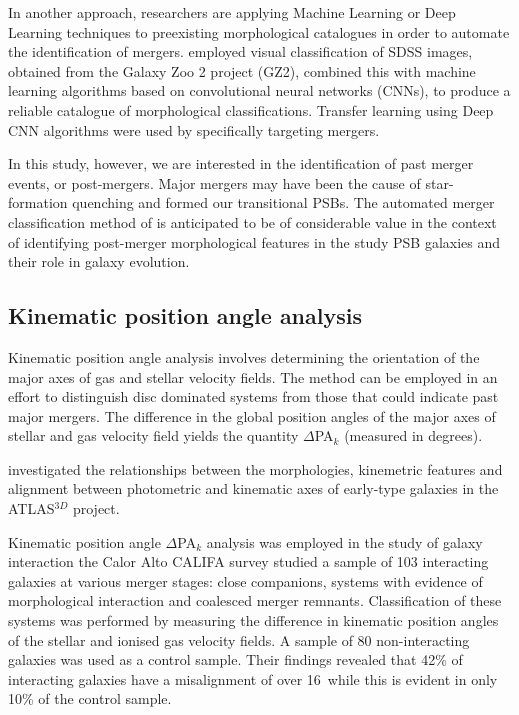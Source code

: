 In another approach, researchers are applying Machine Learning or Deep Learning techniques to preexisting morphological catalogues in order to automate the identification of mergers. \citet{2018MNRAS.476.3661D} employed visual classification of SDSS images, obtained from the Galaxy Zoo 2 project (GZ2), combined this with machine learning algorithms based on convolutional neural networks (CNNs), to produce a reliable catalogue of  morphological classifications. Transfer learning using Deep CNN algorithms were used by \citet{2018MNRAS.479..415A} specifically targeting mergers. 

In this study, however, we are interested in the identification of past merger events, or post-mergers. Major mergers may have been the cause of star-formation quenching and formed our transitional PSBs. The automated merger classification method of  \cite{2019DDA....5020304N} is anticipated to be of considerable value in the context of identifying post-merger morphological features in the study PSB galaxies and their role in galaxy evolution. 


\subsection{Kinematic position angle analysis}
Kinematic position angle analysis involves determining the orientation of the major axes of gas and stellar velocity fields. The method can be employed in an effort to distinguish disc dominated systems from those that could indicate past major mergers. The difference in the global position angles of the major axes of stellar and gas velocity field yields the quantity $\Delta$PA$_{k}$ (measured in degrees).

\citet{2011MNRAS.414.2923K} investigated the relationships between the morphologies, kinemetric features and alignment between photometric and kinematic axes of early-type galaxies in the ATLAS$^{3D}$ project.

Kinematic position angle $\Delta$PA$_k$ analysis was employed in the study of galaxy interaction the Calor Alto CALIFA survey \citet{2015A&A...582A..21B} studied a sample of 103 interacting galaxies at various merger stages: close companions, systems with evidence of morphological interaction and coalesced merger remnants. Classification of these systems was performed by measuring the difference in kinematic position angles of the stellar and ionised gas velocity fields. A sample of 80 non-interacting galaxies was used as a control sample. Their findings revealed that 42\% of interacting galaxies have a misalignment of over 16\textdegree\ while this is evident in only 10\% of the control sample.

